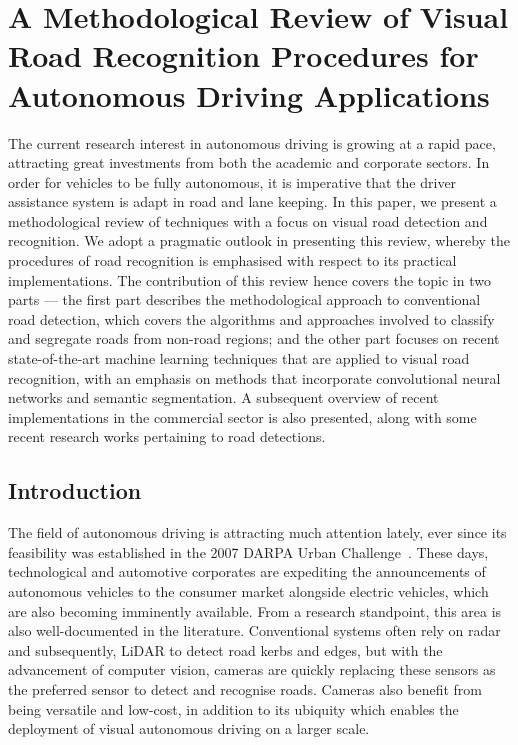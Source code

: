 
\chapter[Visual Road Recognition Review]{A Methodological Review of Visual Road Recognition Procedures for Autonomous Driving Applications}
\label{ch:vrreview}

\ifpdf
    \graphicspath{{Chapter2/Figs/Raster/}{Chapter2/Figs/PDF/}{Chapter2/Figs/}}
\else
    \graphicspath{{Chapter2/Figs/Vector/}{Chapter2/Figs/}}
\fi

The current research interest in autonomous driving is growing at a rapid pace, attracting great investments from both the academic and corporate sectors. In order for vehicles to be fully autonomous, it is imperative that the driver assistance system is adapt in road and lane keeping. In this paper, we present a methodological review of techniques with a focus on visual road detection and recognition. We adopt a pragmatic outlook in presenting this review, whereby the procedures of road recognition is emphasised with respect to its practical implementations. The contribution of this review hence covers the topic in two parts --- the first part describes the methodological approach to conventional road detection, which covers the algorithms and approaches involved to classify and segregate roads from non-road regions; and the other part focuses on recent state-of-the-art machine learning techniques that are applied to visual road recognition, with an emphasis on methods that incorporate convolutional neural networks and semantic segmentation. A subsequent overview of recent implementations in the commercial sector is also presented, along with some recent research works pertaining to road detections.

\section{Introduction}\label{secintro}
The field of autonomous driving is attracting much attention lately, ever since its feasibility was established in the 2007 DARPA Urban Challenge~\cite{buehler_darpa_2009}. These days, technological and automotive corporates are expediting the announcements of autonomous vehicles to the consumer market alongside electric vehicles, which are also becoming imminently available. From a research standpoint, this area is also well-documented in the literature. Conventional systems often rely on radar and subsequently, LiDAR to detect road kerbs and edges, but with the advancement of computer vision, cameras are quickly replacing these sensors as the preferred sensor to detect and recognise roads. Cameras also benefit from being versatile and low-cost, in addition to its ubiquity which enables the deployment of visual autonomous driving on a larger scale. 

